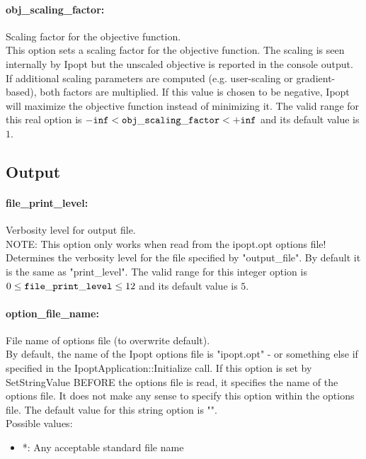 \paragraph{obj\_scaling\_factor:}\label{sec:obj_scaling_factor} Scaling factor for the objective function. $\;$ \\
 This option sets a scaling factor for the
objective function. The scaling is seen
internally by Ipopt but the unscaled objective is
reported in the console output. If additional
scaling parameters are computed (e.g.
user-scaling or gradient-based), both factors are
multiplied. If this value is chosen to be
negative, Ipopt will maximize the objective
function instead of minimizing it. The valid range for this real option is 
${\tt -inf} <  {\tt obj\_scaling\_factor } <  {\tt +inf}$
and its default value is $1$.


\subsection{Output}
\label{sec:Output}
\paragraph{file\_print\_level:}\label{sec:file_print_level} Verbosity level for output file. $\;$ \\
 NOTE: This option only works when read from the
ipopt.opt options file! Determines the verbosity
level for the file specified by "output\_file". 
By default it is the same as "print\_level". The valid range for this integer option is
$0 \le {\tt file\_print\_level } \le 12$
and its default value is $5$.


\paragraph{option\_file\_name:}\label{sec:option_file_name} File name of options file (to overwrite default). $\;$ \\
 By default, the name of the Ipopt options file is
"ipopt.opt" - or something else if specified in
the IpoptApplication::Initialize call. If this
option is set by SetStringValue BEFORE the
options file is read, it specifies the name of
the options file.  It does not make any sense to
specify this option within the options file.
The default value for this string option is "".
\\ 
Possible values:
\begin{itemize}
   \item *: Any acceptable standard file name
\end{itemize}

